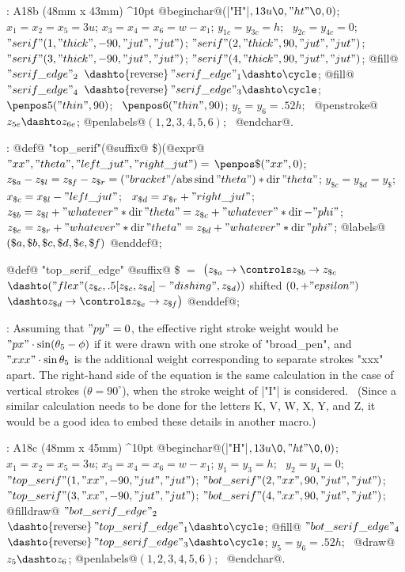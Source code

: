 :
 \rightfig A18b (48mm x 43mm) ^10pt
@beginchar@\kern1pt(|"H"|$,13u\0,"ht"\0,0)$;\parbreak
$x_1=x_2=x_5=3u$;\parbreak
$x_3=x_4=x_6=w-x_1$;\parbreak
$y_{1c}=y_{3c}=h$; \ $y_{2c}=y_{4c}=0$;\parbreak
$"serif"(1,"thick",-90,"jut","jut")$;\parbreak
$"serif"(2,"thick",90,"jut","jut")$;\parbreak
$"serif"(3,"thick",-90,"jut","jut")$;\parbreak
$"serif"(4,"thick",90,"jut","jut")$;\parbreak
@fill@ $"serif\_edge"_2$\parbreak
\quad$\dashto{\rm reverse}\,"serif\_edge"_1\dashto\cycle$;\parbreak
@fill@ $"serif\_edge"_4$\parbreak
\quad$\dashto{\rm reverse}\,"serif\_edge"_3\dashto\cycle$;\parbreak
$\penpos5("thin",90)$; \ $\penpos6("thin",90)$;\parbreak
$y_5=y_6=.52h$; \ @penstroke@ $z_{5e}\dashto z_{6e}$;\parbreak
@penlabels@$(1,2,3,4,5,6)$; \ @endchar@.

:
 @def@ "top\_serif"(@suffix@ \$)(@expr@ $"xx","theta",
 "left\_jut","right\_jut")=$\parbreak
\quad $\penpos\$("xx",0)$; \
$z_{\$a}-z_{\$l}=z_{\$\mkern-1muf}-z_{\$r}=
 ("bracket"/{\rm abs\,sind\,}"theta")\ast{\rm dir}\,"theta"$;\parbreak
\quad $y_{\$c}=y_{\$d}=y_\$$; \
 $x_{\$c}=x_{\$l}-"left\_jut"$; \ $x_{\$d}=x_{\$r}+"right\_jut"$;\parbreak
\quad $z_{\$b}=z_{\$l}+"whatever"\ast{\rm dir}\,"theta"
 =z_{\$c}+"whatever"\ast{\rm dir}\,{-"phi"}$;\parbreak
\quad $z_{\$e}=z_{\$r}+"whatever"\ast{\rm dir}\,"theta"
 =z_{\$d}+"whatever"\ast{\rm dir}\,"phi"$;\parbreak
\quad @labels@$(\$a,\$b,\$c,\$d,\$e,\$\mkern-1muf)$ @enddef@;\par
\smallskip\indent
@def@ "top\_serif\_edge" @suffix@ \$ $=$\parbreak
\quad $\bigl(z_{\$a}\to\controls z_{\$b}\to z_{\$c}$\parbreak
\qquad $\dashto("flex"(z_{\$c},.5[z_{\$c},z_{\$d}]-"dishing",
 z_{\$d}))$ shifted $(0,+"epsilon")$\parbreak
\qquad $\dashto z_{\$d}\to\controls z_{\$e}\to z_{\$\mkern-1muf}
 \bigr)$ @enddef@;

:
 Assuming that $"py"=0$, the effective right stroke weight would be
$"px"\cdot\sin(\theta_5-\phi)$ if it were drawn with one stroke of "broad\_pen",
and $"xxx"\cdot\sin\theta_5$ is the additional weight corresponding to separate
strokes "xxx" apart. The right-hand side of the equation is the same
calculation in the case of vertical strokes ($\theta=90^\circ$), when the
stroke weight of |"I"| is considered. \ (Since a similar calculation
needs to be done for the letters K, V, W, X, Y, and Z, it would be a good
idea to embed these details in another macro.)

:
 \rightfig A18c (48mm x 45mm) ^10pt
@beginchar@\kern1pt(|"H"|$,13u\0,"ht"\0,0)$;\parbreak
$x_1=x_2=x_5=3u$;\parbreak
$x_3=x_4=x_6=w-x_1$;\parbreak
$y_1=y_3=h$; \ $y_2=y_4=0$;\parbreak
$"top\_serif"(1,"xx",-90,"jut","jut")$;\parbreak
$"bot\_serif"(2,"xx",90,"jut","jut")$;\parbreak
$"top\_serif"(3,"xx",-90,"jut","jut")$;\parbreak
$"bot\_serif"(4,"xx",90,"jut","jut")$;\parbreak
@filldraw@ $"bot\_serif\_edge"_2$\parbreak
\quad$\dashto{\rm reverse}\,"top\_serif\_edge"_1\dashto\cycle$;\parbreak
@fill@ $"bot\_serif\_edge"_4$\parbreak
\quad$\dashto{\rm reverse}\,"top\_serif\_edge"_3\dashto\cycle$;\parbreak
$y_5=y_6=.52h$; \ @draw@ $z_5\dashto z_6$;\parbreak
@penlabels@$(1,2,3,4,5,6)$; \ @endchar@.

